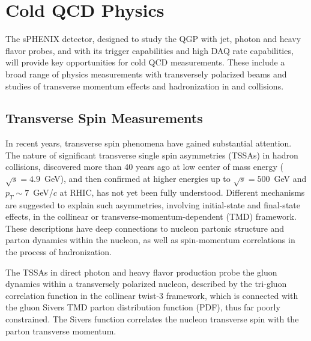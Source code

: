 \section{Cold QCD Physics}
\label{sec:ColdQCD}

The sPHENIX detector, designed to study the QGP with jet, photon and
heavy flavor probes, and with its trigger capabilities and high DAQ
rate capabilities, will provide key opportunities for cold QCD
measurements. These include a broad range of physics measurements with
transversely polarized beams and studies of transverse momentum
effects and hadronization in \pp and \pA collisions.   


\subsection {Transverse Spin Measurements}

In recent years, transverse spin phenomena have gained substantial
attention. The nature of significant transverse single spin
asymmetries (TSSAs) in hadron collisions, discovered more than 40
years ago at low center of mass energy ($\sqrt{s}=4.9$~GeV), and then
confirmed at higher energies up to $\sqrt{s}=500$~GeV and $p_T \sim
7$~GeV/$c$ at RHIC, has not yet been fully understood. Different
mechanisms are suggested to explain such asymmetries, involving
initial-state and final-state effects, in the collinear or
transverse-momentum-dependent (TMD) framework. These descriptions have
deep connections to nucleon partonic structure and parton dynamics
within the nucleon, as well as spin-momentum correlations in the
process of hadronization. 

The TSSAs in direct photon and heavy flavor production probe the gluon
dynamics within a transversely polarized nucleon, described by the
tri-gluon correlation function in the collinear twist-3 framework,
which is connected with the gluon Sivers TMD parton distribution
function (PDF), thus far poorly constrained. The Sivers function
correlates the nucleon transverse spin with the parton transverse
momentum. 

